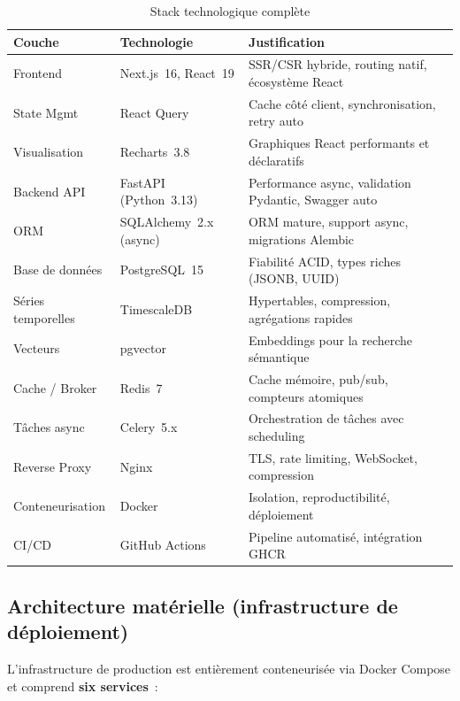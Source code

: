 \begin{table}[H]
\centering
\caption{Stack technologique complète}
\label{tab:stack}
\begin{tabularx}{\textwidth}{|p{2.8cm}|p{3.5cm}|X|}
\hline
\textbf{Couche} & \textbf{Technologie} & \textbf{Justification} \\
\hline
Frontend & Next.js~16, React~19 & SSR/CSR hybride, routing natif, écosystème React \\
\hline
State Mgmt & React Query & Cache côté client, synchronisation, retry auto \\
\hline
Visualisation & Recharts~3.8 & Graphiques React performants et déclaratifs \\
\hline
Backend API & FastAPI (Python~3.13) & Performance async, validation Pydantic, Swagger auto~\cite{fastapi2024} \\
\hline
ORM & SQLAlchemy~2.x (async) & ORM mature, support async, migrations Alembic \\
\hline
Base de données & PostgreSQL~15 & Fiabilité ACID, types riches (JSONB, UUID)\\
\hline
Séries temporelles & TimescaleDB & Hypertables, compression, agrégations rapides~\cite{timescaledb2024}  \\
\hline
Vecteurs & pgvector & Embeddings pour la recherche sémantique \\
\hline
Cache / Broker & Redis~7 & Cache mémoire, pub/sub, compteurs atomiques \\
\hline
Tâches async & Celery~5.x & Orchestration de tâches avec scheduling~\cite{celery2024} \\
\hline
Reverse Proxy & Nginx & TLS, rate limiting, WebSocket, compression \\
\hline
Conteneurisation & Docker & Isolation, reproductibilité, déploiement \\
\hline
CI/CD & GitHub Actions & Pipeline automatisé, intégration GHCR \\
\hline
\end{tabularx}
\end{table}

\subsection{Architecture matérielle (infrastructure de déploiement)}

L'infrastructure de production est entièrement conteneurisée via Docker Compose et comprend \textbf{six services}~:

